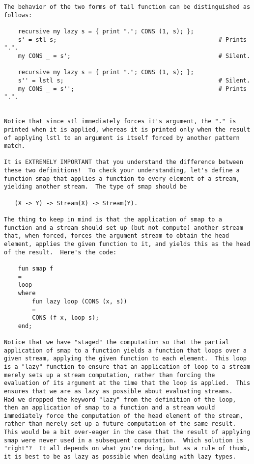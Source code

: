 \begin{verbatim}
The behavior of the two forms of tail function can be distinguished as 
follows: 
 
    recursive my lazy s = { print "."; CONS (1, s); };  
    s' = stl s;                                              # Prints ".".  
    my CONS _ = s';                                          # Silent. 
 
    recursive my lazy s = { print "."; CONS (1, s); };  
    s'' = lstl s;                                            # Silent. 
    my CONS _ = s'';                                         # Prints ".". 
 
 
Notice that since stl immediately forces it's argument, the "." is 
printed when it is applied, whereas it is printed only when the result 
of applying lstl to an argument is itself forced by another pattern 
match. 
 
It is EXTREMELY IMPORTANT that you understand the difference between 
these two definitions!  To check your understanding, let's define a 
function smap that applies a function to every element of a stream, 
yielding another stream.  The type of smap should be 
 
   (X -> Y) -> Stream(X) -> Stream(Y). 
 
The thing to keep in mind is that the application of smap to a 
function and a stream should set up (but not compute) another stream 
that, when forced, forces the argument stream to obtain the head 
element, applies the given function to it, and yields this as the head 
of the result.  Here's the code: 
 
    fun smap f 
	= 
	loop 
	where 
	    fun lazy loop (CONS (x, s)) 
		= 
		CONS (f x, loop s); 
	end; 
 
Notice that we have "staged" the computation so that the partial 
application of smap to a function yields a function that loops over a 
given stream, applying the given function to each element.  This loop 
is a "lazy" function to ensure that an application of loop to a stream 
merely sets up a stream computation, rather than forcing the 
evaluation of its argument at the time that the loop is applied.  This 
ensures that we are as lazy as possible about evaluating streams. 
Had we dropped the keyword "lazy" from the definition of the loop, 
then an application of smap to a function and a stream would 
immediately force the computation of the head element of the stream, 
rather than merely set up a future computation of the same result. 
This would be a bit over-eager in the case that the result of applying 
smap were never used in a subsequent computation.  Which solution is 
"right"?  It all depends on what you're doing, but as a rule of thumb, 
it is best to be as lazy as possible when dealing with lazy types. 
 

\end{verbatim}
